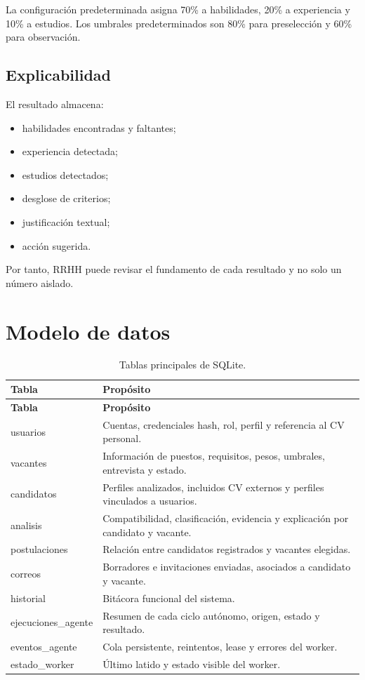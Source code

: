 \documentclass[12pt,a4paper]{article}
\begin{document}
La configuración predeterminada asigna 70\% a habilidades, 20\% a experiencia y 10\% a estudios. Los umbrales predeterminados son 80\% para preselección y 60\% para observación.

\subsection{Explicabilidad}

El resultado almacena:

\begin{itemize}[leftmargin=*]
    \item habilidades encontradas y faltantes;
    \item experiencia detectada;
    \item estudios detectados;
    \item desglose de criterios;
    \item justificación textual;
    \item acción sugerida.
\end{itemize}

Por tanto, RRHH puede revisar el fundamento de cada resultado y no solo un número aislado.

\section{Modelo de datos}

\begin{longtable}{>{\ttfamily}p{3.3cm}>{\raggedright\arraybackslash}p{10.9cm}}
\caption{Tablas principales de SQLite.}\\
\toprule
\textbf{Tabla} & \textbf{Propósito} \\
\midrule
\endfirsthead
\toprule
\textbf{Tabla} & \textbf{Propósito} \\
\midrule
\endhead
usuarios & Cuentas, credenciales hash, rol, perfil y referencia al CV personal. \\
vacantes & Información de puestos, requisitos, pesos, umbrales, entrevista y estado. \\
candidatos & Perfiles analizados, incluidos CV externos y perfiles vinculados a usuarios. \\
analisis & Compatibilidad, clasificación, evidencia y explicación por candidato y vacante. \\
postulaciones & Relación entre candidatos registrados y vacantes elegidas. \\
correos & Borradores e invitaciones enviadas, asociados a candidato y vacante. \\
historial & Bitácora funcional del sistema. \\
ejecuciones\_agente & Resumen de cada ciclo autónomo, origen, estado y resultado. \\
eventos\_agente & Cola persistente, reintentos, lease y errores del worker. \\
estado\_worker & Último latido y estado visible del worker. \\
\bottomrule
\end{longtable}
\end{document}
